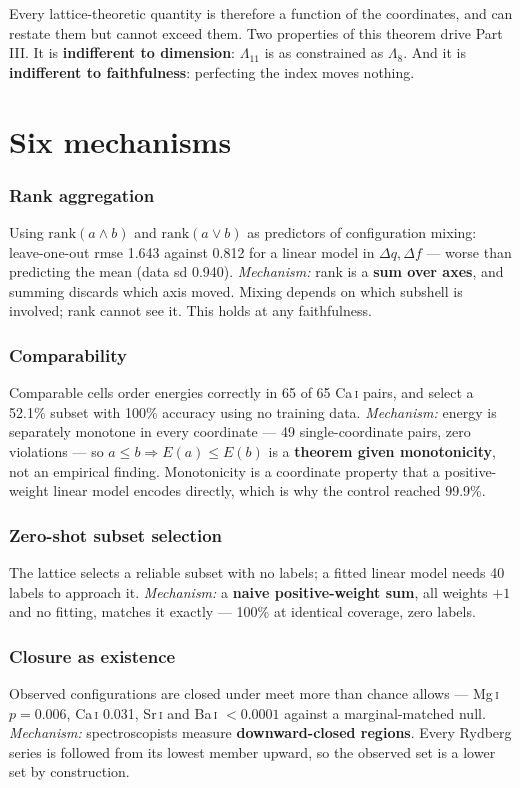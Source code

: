 \documentclass[11pt,a4paper]{article}
\theoremstyle{definition}
\newcommand{\Le}{\ensuremath{\Lambda_{8}}}
\begin{document}
Every lattice-theoretic quantity is therefore a function of the coordinates, and
can restate them but cannot exceed them. Two properties of this theorem drive
Part III. It is \textbf{indifferent to dimension}: $\Lambda_{11}$ is as
constrained as \Le{}. And it is \textbf{indifferent to faithfulness}: perfecting
the index moves nothing.

\section{Six mechanisms}

\subsubsection*{Rank aggregation}
Using $\mathrm{rank}(a\wedge b)$ and $\mathrm{rank}(a\vee b)$ as predictors of
configuration mixing: leave-one-out rmse 1.643 against 0.812 for a linear model
in $\Delta q,\Delta f$ --- worse than predicting the mean (data sd 0.940).
\emph{Mechanism:} rank is a \textbf{sum over axes}, and summing discards which
axis moved. Mixing depends on which subshell is involved; rank cannot see it.
This holds at any faithfulness.

\subsubsection*{Comparability}
Comparable cells order energies correctly in 65 of 65 Ca\,\textsc{i} pairs, and
select a 52.1\% subset with 100\% accuracy using no training data.
\emph{Mechanism:} energy is separately monotone in every coordinate --- 49
single-coordinate pairs, zero violations --- so $a\le b \Rightarrow E(a)\le E(b)$
is a \textbf{theorem given monotonicity}, not an empirical finding. Monotonicity
is a coordinate property that a positive-weight linear model encodes directly,
which is why the control reached 99.9\%.

\subsubsection*{Zero-shot subset selection}
The lattice selects a reliable subset with no labels; a fitted linear model
needs 40 labels to approach it. \emph{Mechanism:} a \textbf{naive
positive-weight sum}, all weights $+1$ and no fitting, matches it exactly ---
100\% at identical coverage, zero labels.

\subsubsection*{Closure as existence}
Observed configurations are closed under meet more than chance allows ---
Mg\,\textsc{i} $p=0.006$, Ca\,\textsc{i} 0.031, Sr\,\textsc{i} and
Ba\,\textsc{i} $<0.0001$ against a marginal-matched null. \emph{Mechanism:}
spectroscopists measure \textbf{downward-closed regions}. Every Rydberg series
is followed from its lowest member upward, so the observed set is a lower set by
construction.
\end{document}
